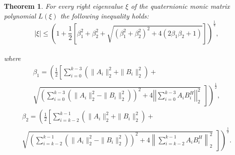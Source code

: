\documentclass [12pt]{article}
\newtheorem{theorem}{Theorem}
[section]
\begin{document}
   

\begin{theorem}{\label{theorem 3.6}}
     For every right eigenvalue $\xi$ of the quaternionic monic matrix polynomial $L(\xi)$ the following inequality holds:\\
    \begin{equation*}
|\xi| \le \left( 1+\frac{1}{2} \left[ \beta^{2}_{1} + \beta^{2}_{2} +\sqrt{(\beta^{2}_{1}+\beta^{2}_{2})^{2}+4\left(2\beta_{1}\beta_{2} + 1 \right) }\right] \right)^{\frac{1}{4}},
\end{equation*}\\
where \begin{multline*}
 \beta_{1}=\left( \frac{1}{2} \left[ \sum_{i=0}^{k-3}\left(\|A_{i}\|^{2}_{2}+\|B_{i}\|_{2}^{2}\right)+ \right. \right. \\
\left. \left.\sqrt{ \left( \sum_{i=0}^{k-3}\left(\|A_{i}\|^{2}_{2}-\|B_{i}\|_{2}^{2} \right)     \right)^{2}            +4\left|\left|\sum_{i=0}^{k-3}A_{i}{B_{i}^{H}}\right|\right|_{2}^{2} }~~\right]  \right)^{\frac{1}{2}},
\end{multline*}
\begin{multline*} 
\beta_{2}=\left( \frac{1}{2} \left[ \sum_{i=k-2}^{k-1}\left(\|A_{i}\|^{2}_{2}+\|B_{i}\|_{2}^{2}\right)+ \right. \right. \\
\left. \left. \sqrt{ \left( \sum_{i=k-2}^{k-1}\left(\|A_{i}\|^{2}_{2}-\|B_{i}\|_{2}^{2} \right) \right)^{2} +4\left\|\sum_{i=k-2}^{k-1}A_{i}{B_{i}^{H}}\right\|_{2}^{2} }~~\right] \right)^{\frac{1}{2}}. 
\end{multline*}


\end{theorem}
\end{document}
